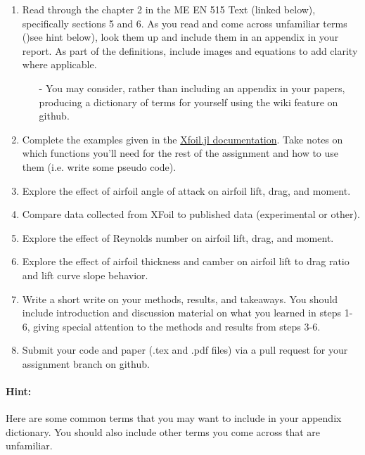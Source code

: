 \documentclass[12pt]{article}
\begin{document}
\begin{enumerate}
	\item Read  through the chapter 2 in the ME EN 515 Text (linked below), specifically sections 5 and 6.  As you read and come across unfamiliar terms ()see hint below), look them up and include them in an appendix in your report.  As part of the definitions, include images and equations to add clarity where applicable.
	\begin{itemize}
		\item[-] You may consider, rather than including an appendix in your papers, producing a dictionary of terms for yourself using the wiki feature on github.
	\end{itemize}
	\item Complete the examples given in the \href{https://flow.byu.edu/Xfoil.jl/stable/}{Xfoil.jl documentation}. Take notes on which functions you'll need for the rest of the assignment and how to use them (i.e. write some pseudo code). 
	\item Explore the effect of airfoil angle of attack on airfoil lift, drag, and moment.
	\item Compare data collected from XFoil to published data (experimental or other). 
	\item Explore the effect of Reynolds number on airfoil lift, drag, and moment.
	\item Explore the effect of airfoil thickness and camber on airfoil lift to drag ratio and lift curve slope behavior.
	\item Write a short write on your methods, results, and takeaways. You should include introduction and discussion material on what you learned in steps 1-6, giving special attention to the methods and results from steps 3-6. 
	\item Submit your code and paper (.tex and .pdf files) via a pull request for your assignment branch on github.
\end{enumerate}

\bigskip

\paragraph{Hint:} Here are some common terms that you may want to include in your appendix dictionary. You should also include other terms you come across that are unfamiliar.
\end{document}
